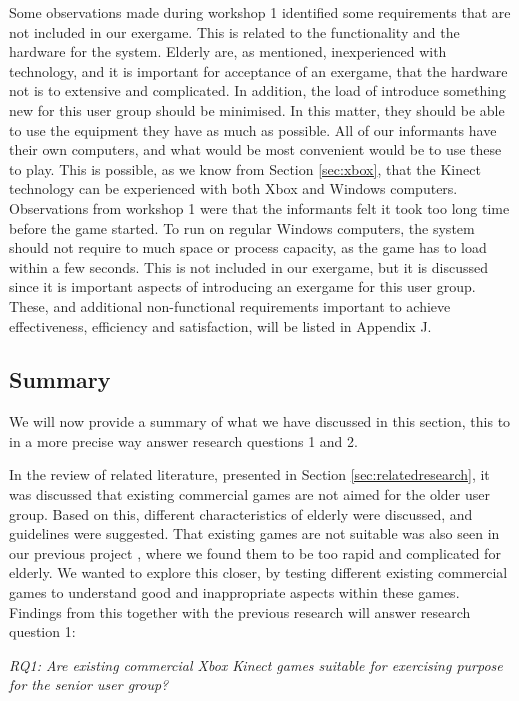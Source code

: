 Some observations made during workshop 1 identified some requirements that are not included in our exergame. This is related to the functionality and the hardware for the system. Elderly are, as mentioned, inexperienced with technology, and it is important for acceptance of an exergame, that the hardware not is to extensive and complicated. In addition, the load of introduce something new for this user group should be minimised. In this matter, they should be able to use the equipment they have as much as possible. All of our informants have their own computers, and what would be most convenient would be to use these to play. This is possible, as we know from Section \ref{sec:xbox}, that the Kinect technology can be experienced with both Xbox and Windows computers. Observations from workshop 1 were that the informants felt it took too long time before the game started. To run on regular Windows computers, the system should not require to much space or process capacity, as the game has to load within a few seconds. This is not included in our exergame, but it is discussed since it is important aspects of introducing an exergame for this user group. These, and additional non-functional requirements important to achieve effectiveness, efficiency and satisfaction, will be listed in Appendix J.  

\subsection{Summary}
We will now provide a summary of what we have discussed in this section, this to in a more precise way answer research questions 1 and 2. 

In the review of related literature, presented in Section \ref{sec:relatedresearch}, it was discussed that existing commercial games are not aimed for the older user group. Based on this, different characteristics of elderly were discussed, and guidelines were suggested. That existing games are not suitable was also seen in our previous project \cite{project}, where we found them to be too rapid and complicated for elderly. We wanted to explore this closer, by testing different existing commercial games to understand good and inappropriate aspects within these games. Findings from this together with the previous research will answer research question 1:

\emph{RQ1: Are existing commercial Xbox Kinect games suitable for exercising purpose for the senior user group?}

